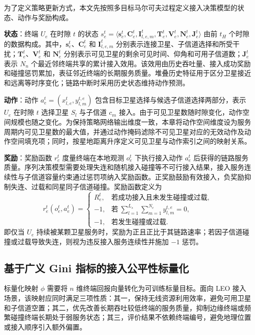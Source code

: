 为了定义策略更新方式，本文先按照多目标马尔可夫过程定义接入决策模型的状态、动作与奖励构成。

\textbf{状态}：终端 $U_e$ 在时隙 $t$ 的状态 $s_e^t=\langle\mathbf{s}_e^t,\mathbf{C}_e^t,\mathbf{I}_{l,e,m}^t,\mathbf{T}_e^t,\mathbf{V}_e^t,\mathbf{N}_e^t,\mathbf{J}_e^t\rangle$ 由前 $t_H$ 个时隙的数据构成。其中，$\mathbf{s}_e^t$、$\mathbf{C}_e^t$ 和 $\mathbf{I}_{l,e,m}^t$ 分别表示连接卫星、子信道选择和所受干扰；$\mathbf{T}_e^t$、$\mathbf{V}_e^t$ 和 $\mathbf{N}_e^t$ 分别表示可见卫星的剩余可见时间、仰角和可用子信道数；$\mathbf{J}_e^t$ 表示 $N_n$ 个最近邻终端共享的累计接入效用。该效用由历史吞吐量、接入成功奖励和碰撞惩罚累加，表征邻近终端的长期服务质量。堆叠历史特征用于区分卫星接近和远离等时序变化；链路中断时采用历史状态维持动作预测。

\textbf{动作}：动作 $a_e^t=(x_{l,e}^t,y_{l,m}^{t,e})$ 包含目标卫星选择与候选子信道选择两部分，表示 $U_e$ 在时隙 $t$ 选择卫星 $S_l$ 与子信道 $c_m$ 接入。由于可见卫星数随时隙变化，动作空间规模也随之变化。为保持策略网络输出维度一致，本章将动作空间维度设为服务周期内可见卫星数的最大值，并通过动作掩码滤除不可见卫星对应的无效动作及动作空间填充项；同时，按星地距离升序定义可见卫星与动作索引之间的映射关系。

\textbf{奖励}：奖励函数 $r_e^t$ 度量终端在本地观测 $o_e^t$ 下执行接入动作 $a_e^t$ 后获得的链路服务质量。序列决策模型需要处理失连和随机接入碰撞等不可行接入结果，接入服务连续性与子信道容量约束通过惩罚项纳入奖励函数。正奖励鼓励有效接入，负奖励抑制失连、过载和同星同子信道碰撞。奖励函数定义为
\begin{equation}\label{eq:ch3_reward}
r_e^t(o_e^t,a_e^t)=
\begin{cases}
R_e^t, & \text{若成功接入且未发生碰撞或过载},\\[2pt]
-1, & \text{若}~\sum_{l=1}^{L_s}\sum_{m=1}^{N_c}y_{l,m}^{t,e}=0,\\[2pt]
-1, & \text{若发生碰撞或过载}.
\end{cases}
\end{equation}
即仅当 $U_e$ 持续被某颗卫星服务时，奖励为正且正比于其链路速率；若因子信道碰撞或过载导致失连，则视为违反接入服务连续性并施加 $-1$ 惩罚。

\subsection{基于广义 Gini 指标的接入公平性标量化}
\label{subsec:ch3_ggf}

标量化映射 $\phi$ 需要将 $n$ 维终端回报向量转化为可训练标量目标。面向 LEO 接入场景，该映射应同时满足三项性质：其一，保持无线资源利用效率，避免可用卫星和子信道空置；其二，优先改善长期吞吐较低终端的服务质量，抑制边缘终端或频繁碰撞终端长期处于弱服务状态；其三，评价结果不依赖终端编号，避免地理位置或接入顺序引入额外偏置。

